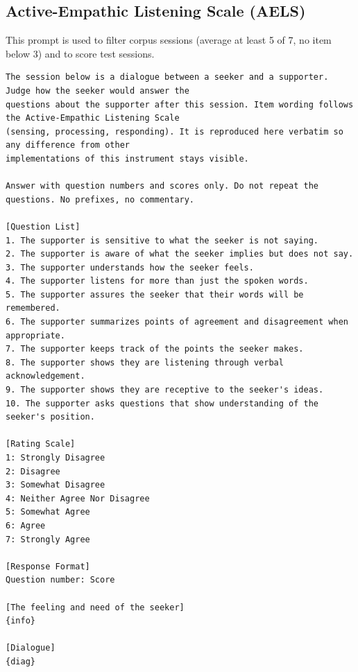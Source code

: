 \documentclass[journal]{IEEEtran}
\begin{document}
\subsection{Active-Empathic Listening Scale (AELS)}
This prompt is used to filter corpus sessions (average at least 5 of 7, no item below 3) and to score test sessions.
\begin{lstlisting}
The session below is a dialogue between a seeker and a supporter. Judge how the seeker would answer the
questions about the supporter after this session. Item wording follows the Active-Empathic Listening Scale
(sensing, processing, responding). It is reproduced here verbatim so any difference from other
implementations of this instrument stays visible.

Answer with question numbers and scores only. Do not repeat the questions. No prefixes, no commentary.

[Question List]
1. The supporter is sensitive to what the seeker is not saying.
2. The supporter is aware of what the seeker implies but does not say.
3. The supporter understands how the seeker feels.
4. The supporter listens for more than just the spoken words.
5. The supporter assures the seeker that their words will be remembered.
6. The supporter summarizes points of agreement and disagreement when appropriate.
7. The supporter keeps track of the points the seeker makes.
8. The supporter shows they are listening through verbal acknowledgement.
9. The supporter shows they are receptive to the seeker's ideas.
10. The supporter asks questions that show understanding of the seeker's position.

[Rating Scale]
1: Strongly Disagree
2: Disagree
3: Somewhat Disagree
4: Neither Agree Nor Disagree
5: Somewhat Agree
6: Agree
7: Strongly Agree

[Response Format]
Question number: Score

[The feeling and need of the seeker]
{info}

[Dialogue]
{diag}
\end{lstlisting}
\end{document}
